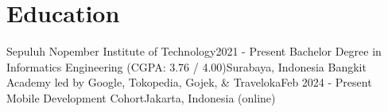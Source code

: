 \section{Education}
    \resumeSubHeadingListStart

    \resumeSubheading
    {Sepuluh Nopember Institute of Technology}{2021 - Present}
    {Bachelor Degree in Informatics Engineering (CGPA: 3.76 / 4.00)}{Surabaya, Indonesia}
    \resumeSubheading
    {Bangkit Academy led by Google, Tokopedia, Gojek, \& Traveloka}{Feb 2024 - Present}
    {Mobile Development Cohort}{Jakarta, Indonesia (online)}

    \resumeSubHeadingListEnd